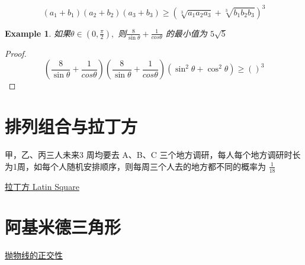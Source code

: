 \documentclass{article}
\newtheorem*{example}{Example}
\begin{document}
	\[
	(a_1 + b_1)(a_2 + b_2)(a_3 + b_3) \geq  ( \sqrt[3]{a_1 a_2 a_3} + \sqrt[3]{b_1 b_2 b_3})^3
	\]
	
	\begin{example}
		  如果\( \theta \in (0, \frac{\pi}{2} ), \) 则\( \frac{8}{\sin \theta} + \frac{1}{cos \theta} \) 的最小值为 \( 5 \sqrt{5} \)
		
	\end{example}
	
	\begin{proof}
		\begin{equation*}
			(\frac{8}{\sin \theta} + \frac{1}{cos \theta})( \frac{8}{\sin \theta} + \frac{1}{cos \theta}) (\sin^2 \theta + \cos^2 \theta) \geq ()^3
		\end{equation*}
	\end{proof}
	
	
	\section{排列组合与拉丁方}
	
	甲，乙、丙三人未来3 周均要去 A、B、C 三个地方调研，每人每个地方调研时长	为1周，如每个人随机安排顺序，则每周三个人去的地方都不同的概率为 \textbf{$\frac{1}{18}$}
	
	\href{https://en.wikipedia.org/wiki/Latin_square}{拉丁方 Latin Square}
	\section{阿基米德三角形}
	\href{https://en.wikipedia.org/wiki/Quadrature_of_the_Parabola}{抛物线的正交性}
\end{document}
